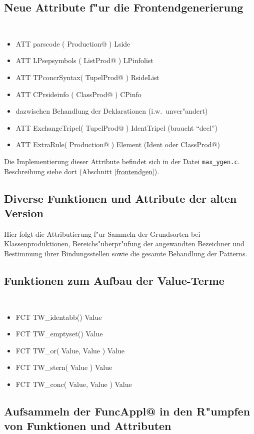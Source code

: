 \subsection{Neue Attribute f"ur die Frontendgenerierung}

{\tt
\begin{itemize}
\item ATT parscode     ( Production@ ) Lside
\item ATT LPsepsymbols ( ListProd@   ) LPinfolist
\item ATT TPconcrSyntax( TupelProd@  ) RsideList
\item ATT CPrsideinfo  ( ClassProd@  ) CPinfo
\item {\rm dazwischen Behandlung der Deklarationen (i.w.\ unver"andert)}
\item ATT ExchangeTripel( TupelProd@ ) IdentTripel {\rm (braucht "`decl"')}
\item ATT ExtraRule( Production@ ) Element  (Ident {\rm oder} ClassProd@)
\end{itemize}
}

Die Implementierung dieser Attribute befindet sich in der Datei {\tt max\_ygen.c}.
Beschreibung siehe dort (Abschnitt \ref{frontendgen}).

\subsection{Diverse Funktionen und Attribute der alten Version}

Hier folgt die Attributierung f"ur Sammeln der Grundsorten bei Klassenproduktionen,
Bereichs"uberpr"ufung der angewandten Bezeichner und Bestimmung ihrer Bindungsstellen
sowie die gesamte Behandlung der Patterns.

\subsection{Funktionen zum Aufbau der Value-Terme}

{\tt
\begin{itemize}
\item FCT TW\_identabb() Value
\item FCT TW\_emptyset() Value
\item FCT TW\_or( Value, Value ) Value
\item FCT TW\_stern( Value ) Value
\item FCT TW\_conc( Value, Value ) Value
\end{itemize}
}

\subsection{Aufsammeln der FuncAppl@ in den R"umpfen von Funktionen und Attributen}

